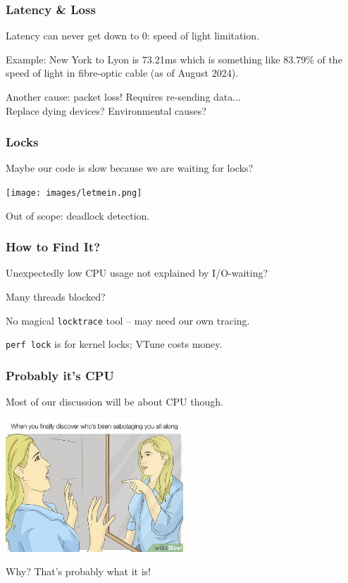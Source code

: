 \begin{frame}
\frametitle{Latency \& Loss}

Latency can never get down to 0: speed of light limitation.

Example: New York to Lyon is 73.21ms which is something like 83.79\% of the speed of light in fibre-optic cable (as of August 2024).

Another cause: packet loss! Requires re-sending data...\\
\quad Replace dying devices? Environmental causes?

\end{frame}


\begin{frame}
\frametitle{Locks}

Maybe our code is slow because we are waiting for locks?

\begin{center}
	\texttt{[image: images/letmein.png]}
\end{center}

Out of scope: deadlock detection.

\end{frame}


\begin{frame}
\frametitle{How to Find It?}

Unexpectedly low CPU usage not explained by I/O-waiting?

Many threads blocked?

No magical \texttt{locktrace} tool -- may need our own tracing.

\texttt{perf lock} is for kernel locks; VTune costs money.

\end{frame}


\begin{frame}
\frametitle{Probably it's CPU}

Most of our discussion will be about CPU though.

\begin{center}
  \includegraphics[width=0.5\textwidth]{images/sabotage.jpg}
\end{center}

Why? That's probably what it is!


\end{frame}

